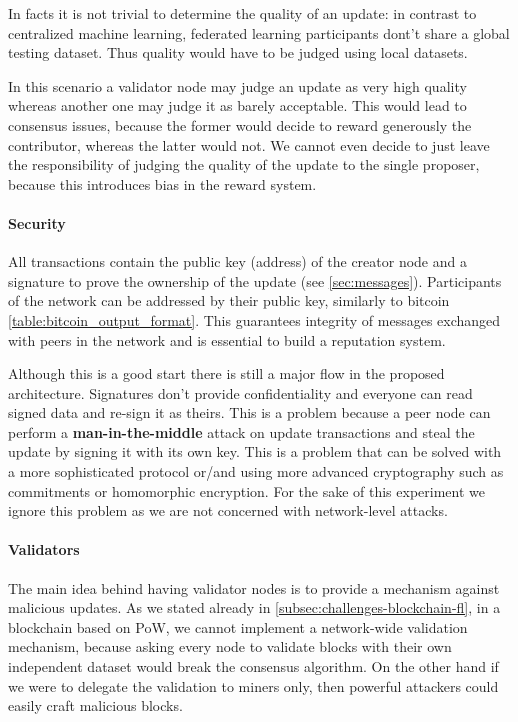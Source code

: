 In facts it is not trivial to determine the quality of an update: in contrast to centralized machine
learning, federated learning participants dont't share a global testing dataset. Thus quality would have to
be judged using local datasets.

In this scenario a validator node may judge an update as very high quality whereas another one may judge it
as barely acceptable.
This would lead to consensus issues, because the former would decide to reward generously the contributor, whereas the
latter would not. We cannot even decide to just leave the responsibility of judging the quality of the update
to the single proposer, because this introduces bias in the reward system.

\paragraph{Security}
All transactions contain the public key (address) of the creator node and a signature to prove the ownership
of the update (see \ref{sec:messages}).
Participants of the network can be addressed by their public key, similarly to bitcoin
\ref{table:bitcoin_output_format}.
This guarantees integrity of messages exchanged with peers in the network and is essential to build a reputation system.

Although this is a good start there is still a major flow in the proposed architecture. Signatures don't
provide confidentiality and everyone can read signed data and re-sign it as theirs.
This is a problem because a peer node can perform a \textbf{man-in-the-middle} attack on update transactions
and steal the
update by signing it with its own key. This is a problem that can be solved with a more sophisticated protocol or/and
using more advanced cryptography such as commitments or homomorphic encryption. For the sake of this
experiment we ignore this problem as we are not concerned with network-level attacks.

\paragraph{Validators}
The main idea behind having validator nodes is to provide a mechanism against malicious updates.
As we stated already in \ref{subsec:challenges-blockchain-fl}, in a blockchain based on PoW, we cannot
implement a network-wide validation mechanism, because asking every node to validate blocks with their own
independent dataset would break the consensus algorithm. On the other hand if we were to delegate the
validation to miners only, then  powerful attackers could easily craft malicious blocks.

